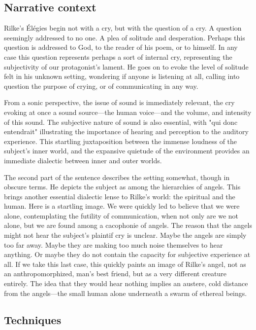 \documentclass[12pt,twoside,maitrise]{dms_ks}
\theoremstyle{definition}
\begin{document}
\subsection{Narrative context}
Rilke's Élégies begin not with a cry, but with the question of a cry.
A question seemingly addressed to no one.
A plea of solitude and desperation.
Perhaps this question is addressed to God, to the reader of his poem, or to himself.
In any case this question represents perhaps a sort of internal cry, representing the subjectivity of our protagonist's lament.
He goes on to evoke the level of solitude felt in his unknown setting, wondering if anyone is listening at all, calling into question the purpose of crying, or of communicating in any way.

From a sonic perspective, the issue of sound is immediately relevant, the cry evoking at once a sound source---the human voice---and the volume, and intensity of this sound.
The subjective nature of sound is also essential, with "qui donc entendrait" illustrating the importance of hearing and perception to the auditory experience.
This startling juxtaposition between the immense loudness of the subject's inner world, and the expansive quietude of the environment provides an immediate dialectic between inner and outer worlds.

The second part of the sentence describes the setting somewhat, though in obscure terms.
He depicts the subject as among the hierarchies of angels.
This brings another essential dialectic lense to Rilke's world: the spiritual and the human.
Here is a startling image.
We were quickly led to believe that we were alone, contemplating the futility of communication, when not only are we not alone, but we are found among a cacophonie of angels.
The reason that the angels might not hear the subject's plaintif cry is unclear. 
Maybe the angels are simply too far away.
Maybe they are making too much noise themselves to hear anything.
Or maybe they do not contain the capacity for subjective experience at all.
If we take this last case, this quickly paints an image of Rilke's angel, not as an anthropomorphized, man's best friend, but as a very different creature entirely.
The idea that they would hear nothing implies an austere, cold distance from the angels---the small human alone underneath a swarm of ethereal beings.

\subsection{Techniques}
\end{document}

